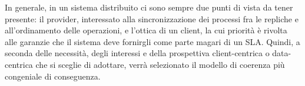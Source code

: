 \documentclass[twoside]{article}
\begin{document}
\begin{multicols}{2}
In generale, in un sistema distribuito ci sono sempre due punti di vista da tener presente: il provider, interessato alla sincronizzazione dei processi fra le repliche e all'ordinamento delle operazioni, e l'ottica di un client, la cui priorità è rivolta alle garanzie che il sistema deve fornirgli come parte magari di un SLA. Quindi, a seconda delle necessità, degli interessi e della prospettiva client-centrica o data-centrica che si sceglie di adottare, verrà selezionato il modello di coerenza più congeniale di conseguenza.

\label{sec:conclusioni}

\printbibliography

\end{multicols}
\end{document}
